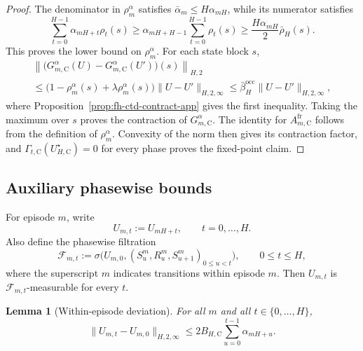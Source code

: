 \documentclass{article}
\newtheorem{lemma}[theorem]{Lemma}
\begin{document}
\begin{proof}
The denominator in $\rho_m^\alpha$ satisfies $\bar\alpha_m\le H\alpha_{mH}$, while its numerator satisfies
\begin{equation}
\sum_{t=0}^{H-1}\alpha_{mH+t}\rho_t(s)\ge\alpha_{mH+H-1}\sum_{t=0}^{H-1}\rho_t(s)\ge\frac{H\alpha_{mH}}{2}\bar\rho_H(s).
\end{equation}
This proves the lower bound on $\rho_m^\alpha$. For each state block $s$,
\begin{equation}
\begin{gathered}
\left\lVert\bigl(G_{m,\mathrm C}^\alpha(U)-G_{m,\mathrm C}^\alpha(U')\bigr)(s)\right\rVert_{H,2}\\
\le\bigl(1-\rho_m^\alpha(s)+\lambda\rho_m^\alpha(s)\bigr)\lVert U-U'\rVert_{H,2,\infty}\le\bar\beta_H^{\mathrm{occ}}\lVert U-U'\rVert_{H,2,\infty},
\end{gathered}
\end{equation}
where Proposition~\ref{prop:fh-ctd-contract-app} gives the first inequality. Taking the maximum over $s$ proves the contraction of $G_{m,\mathrm C}^\alpha$. The identity for $A_{m,\mathrm C}^{\mathrm{fr}}$ follows from the definition of $\rho_m^\alpha$. Convexity of the norm then gives its contraction factor, and $\Gamma_{t,\mathrm C}(U_{H,\mathrm C}^\star)=0$ for every phase proves the fixed-point claim.
\end{proof}

\subsection{Auxiliary phasewise bounds}

For episode $m$, write
\begin{equation}
U_{m,t}:=U_{mH+t},\qquad t=0,\dots,H.
\end{equation}
Also define the phasewise filtration
\begin{equation}
\mathcal F_{m,t} := \sigma\bigl( U_{m,0}, (S_u^m,R_u^m,S_{u+1}^m)_{0 \le u < t} \bigr), \qquad 0 \le t \le H,
\end{equation}
where the superscript $m$ indicates transitions within episode $m$. Then $U_{m,t}$ is $\mathcal F_{m,t}$-measurable for every $t$.

\begin{lemma}[Within-episode deviation]
\label{lem:fh-ctd-within}
For all $m$ and all $t\in\{0,\dots,H\}$,
\begin{equation}
\lVert U_{m,t}-U_{m,0} \rVert_{H,2,\infty} \le 2B_{H,\mathrm C}\sum_{u=0}^{t-1}\alpha_{mH+u}.
\end{equation}
\end{lemma}
\end{document}

